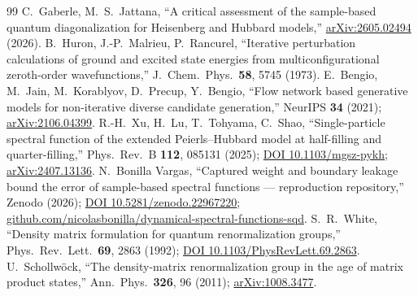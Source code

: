 \begin{thebibliography}{99}
 C.~Gaberle, M.~S.~Jattana, ``A critical assessment of the sample-based quantum diagonalization for Heisenberg and Hubbard models,'' \href{https://arxiv.org/abs/2605.02494}{arXiv:2605.02494} (2026).
 B.~Huron, J.-P.~Malrieu, P.~Rancurel, ``Iterative perturbation calculations of ground and excited state energies from multiconfigurational zeroth-order wavefunctions,'' J.\ Chem.\ Phys.\ \textbf{58}, 5745 (1973).
 E.~Bengio, M.~Jain, M.~Korablyov, D.~Precup, Y.~Bengio, ``Flow network based generative models for non-iterative diverse candidate generation,'' NeurIPS \textbf{34} (2021); \href{https://arxiv.org/abs/2106.04399}{arXiv:2106.04399}.
 R.-H.~Xu, H.~Lu, T.~Tohyama, C.~Shao, ``Single-particle spectral function of the extended Peierls--Hubbard model at half-filling and quarter-filling,'' Phys.\ Rev.\ B \textbf{112}, 085131 (2025); \href{https://doi.org/10.1103/mgsz-pykh}{DOI 10.1103/mgsz-pykh}; \href{https://arxiv.org/abs/2407.13136}{arXiv:2407.13136}.
 N.~Bonilla Vargas, ``Captured weight and boundary leakage bound the error of sample-based spectral functions --- reproduction repository,'' Zenodo (2026); \href{https://doi.org/10.5281/zenodo.22967220}{DOI 10.5281/zenodo.22967220}; \href{https://github.com/nicolasbonilla/dynamical-spectral-functions-sqd}{github.com/nicolasbonilla/dynamical-spectral-functions-sqd}.
 S.~R.~White, ``Density matrix formulation for quantum renormalization groups,'' Phys.\ Rev.\ Lett.\ \textbf{69}, 2863 (1992); \href{https://doi.org/10.1103/PhysRevLett.69.2863}{DOI 10.1103/PhysRevLett.69.2863}.
 U.~Schollw\"ock, ``The density-matrix renormalization group in the age of matrix product states,'' Ann.\ Phys.\ \textbf{326}, 96 (2011); \href{https://arxiv.org/abs/1008.3477}{arXiv:1008.3477}.

\end{thebibliography}
